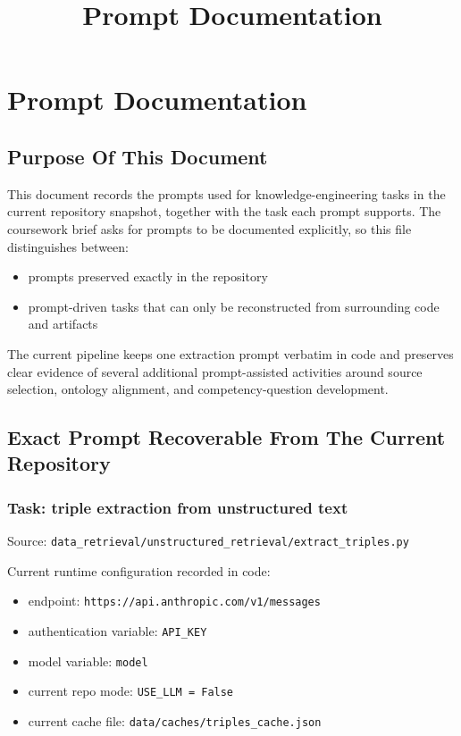\documentclass[
  11pt,
  a4paper,
]{article}
\title{Prompt Documentation}
\author{}
\date{}
\providecommand{\tightlist}{%
  \setlength{\itemsep}{0pt}\setlength{\parskip}{0pt}}
\begin{document}
\maketitle

\section{Prompt Documentation}\label{prompt-documentation}

\subsection{Purpose Of This Document}\label{purpose-of-this-document}

This document records the prompts used for knowledge-engineering tasks
in the current repository snapshot, together with the task each prompt
supports. The coursework brief asks for prompts to be documented
explicitly, so this file distinguishes between:

\begin{itemize}
\tightlist
\item
  prompts preserved exactly in the repository
\item
  prompt-driven tasks that can only be reconstructed from surrounding
  code and artifacts
\end{itemize}

The current pipeline keeps one extraction prompt verbatim in code and
preserves clear evidence of several additional prompt-assisted
activities around source selection, ontology alignment, and
competency-question development.

\subsection{Exact Prompt Recoverable From The Current
Repository}\label{exact-prompt-recoverable-from-the-current-repository}

\subsubsection{Task: triple extraction from unstructured
text}\label{task-triple-extraction-from-unstructured-text}

Source:
\texttt{data\_retrieval/unstructured\_retrieval/extract\_triples.py}

Current runtime configuration recorded in code:

\begin{itemize}
\tightlist
\item
  endpoint: \texttt{https://api.anthropic.com/v1/messages}
\item
  authentication variable: \texttt{API\_KEY}
\item
  model variable: \texttt{model}
\item
  current repo mode: \texttt{USE\_LLM\ =\ False}
\item
  current cache file: \texttt{data/caches/triples\_cache.json}
\end{itemize}
\end{document}
